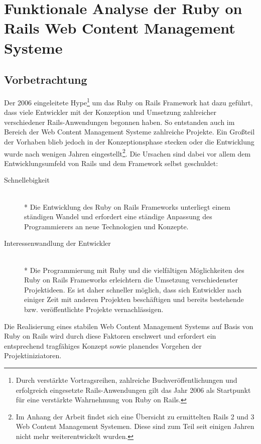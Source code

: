 \chapter{Funktionale Analyse der Ruby on Rails Web Content Management Systeme}


\section{Vorbetrachtung}
Der 2006 eingeleitete Hype\footnote{Durch verstärkte Vortragsreihen, zahlreiche Buchveröffentlichungen und erfolgreich eingesetzte Rails-Anwendungen gilt das Jahr 2006 als Startpunkt für eine verstärkte Wahrnehmung von Ruby on Rails.} um das Ruby on Rails Framework hat dazu geführt, dass viele Entwickler mit der Konzeption und Umsetzung zahlreicher verschiedener Rails-Anwendungen begonnen haben. So entstanden auch im Bereich der Web Content Management Systeme zahlreiche Projekte. Ein Großteil der Vorhaben blieb jedoch in der Konzeptionsphase stecken oder die Entwicklung wurde nach wenigen Jahren eingestellt\footnote{Im Anhang der Arbeit findet sich eine Übersicht zu ermittelten Rails 2 und 3 Web Content Management Systemen. Diese sind zum Teil seit einigen Jahren nicht mehr weiterentwickelt wurden.}. Die Ursachen sind dabei vor allem dem Entwicklungsumfeld von Rails und dem Framework selbst geschuldet:


\begin{description}
\item[Schnellebigkeit]\mbox{~}\\*
Die Entwicklung des Ruby on Rails Frameworks unterliegt einem ständigen Wandel und erfordert eine ständige Anpassung des Programmierers an neue Technologien und Konzepte.
\item[Interessenwandlung der Entwickler]\mbox{~}\\*
Die Programmierung mit Ruby und die vielfältigen Möglichkeiten des Ruby on Rails Frameworks erleichtern die Umsetzung verschiedenster Projektideen.
Es ist daher schneller möglich, dass sich Entwickler nach einiger Zeit mit anderen Projekten beschäftigen und bereits bestehende bzw. veröffentlichte Projekte vernachlässigen.
\end{description}

Die Realisierung eines stabilen Web Content Management Systems auf Basis von Ruby on Rails wird durch diese Faktoren erschwert und erfordert ein entsprechend tragfähiges Konzept sowie planendes Vorgehen der Projektiniziatoren.

